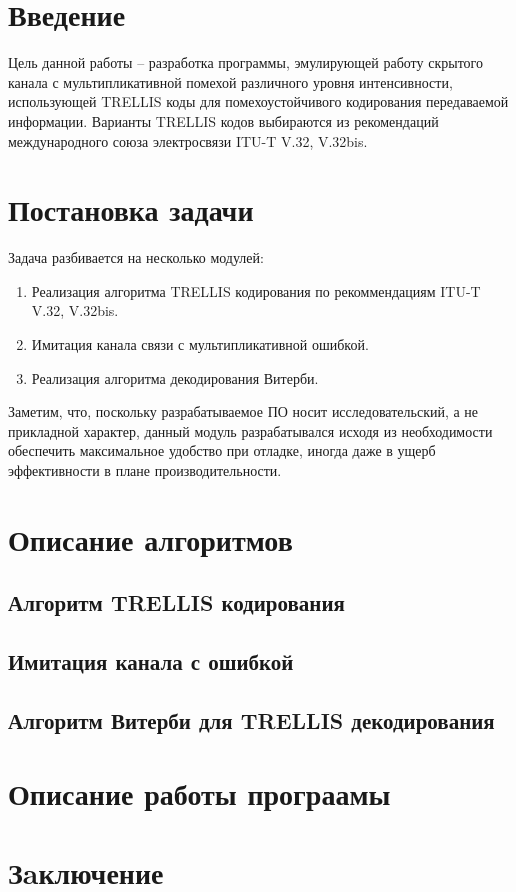 \documentclass[a4paper,12pt]{article}
\begin{document}
\lstset{language=Java}

\section{Введение}

Цель данной работы – разработка программы, эмулирующей работу скрытого канала
с мультипликативной помехой различного уровня интенсивности, использующей TRELLIS коды 
для помехоустойчивого кодирования передаваемой информации. Варианты TRELLIS кодов 
выбираются из рекомендаций международного союза электросвязи ITU-T V.32, V.32bis. 

\section{Постановка задачи}
Задача разбивается на несколько модулей:

\begin{enumerate}
    \item Реализация алгоритма TRELLIS кодирования по рекоммендациям ITU-T V.32, V.32bis.
    \item Имитация канала связи с мультипликативной ошибкой.
    \item Реализация алгоритма декодирования Витерби.
\end{enumerate}

Заметим, что, поскольку разрабатываемое ПО носит исследовательский, а не прикладной характер,
данный модуль разрабатывался  исходя из необходимости обеспечить максимальное удобство при
отладке, иногда даже в ущерб эффективности в плане производительности.

\section{Описание алгоритмов}

\subsection{Алгоритм TRELLIS кодирования}

\subsection{Имитация канала с ошибкой}

\subsection{Алгоритм Витерби для TRELLIS декодирования}

\section{Описание работы програамы}

\section{Зaключение}


\end{document}
